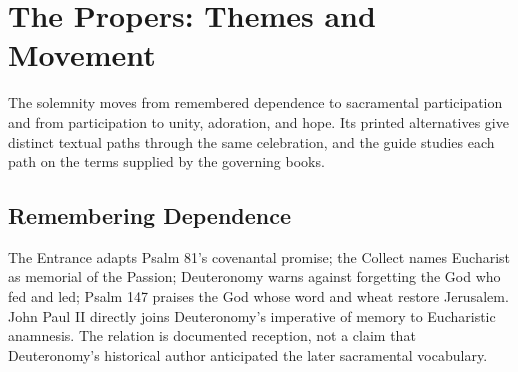 \begin{deepstudy}
\begin{scripturestable}
\end{scripturestable}
\endgroup

\clearpage

\section*{The Propers: Themes and Movement}

The solemnity moves from remembered dependence to sacramental participation and from participation to unity, adoration, and hope. Its printed alternatives give distinct textual paths through the same celebration, and the guide studies each path on the terms supplied by the governing books.

\begin{center}
\end{center}

\subsection*{Remembering Dependence\enspace{}}

The Entrance adapts Psalm 81's covenantal promise; the Collect names Eucharist as memorial of the Passion; Deuteronomy warns against forgetting the God who fed and led; Psalm 147 praises the God whose word and wheat restore Jerusalem. John Paul II directly joins Deuteronomy's imperative of memory to Eucharistic anamnesis. The relation is documented reception, not a claim that Deuteronomy's historical author anticipated the later sacramental vocabulary.


\end{deepstudy}
